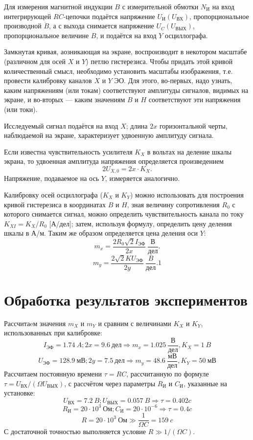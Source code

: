 \documentclass[a4paper, fontsize=14pt]{article}
\begin{document}
Для измерения магнитной индукции $B$ с измерительной обмотки $N_\text{И}$ на вход интегрирующей $RC$-цепочки подаётся напряжение $U_\text{И} (U_\text{ВХ})$, пропорциональное производной $\dot B$, а с выхода снимается напряжение $U_C (U_\text{ВЫХ})$, пропорциональное величине $B$, и подаётся на вход $Y$ осциллографа.

Замкнутая кривая, аозникающая на экране, воспроизводит в некотором масштабе (различном для осей $X$ и $Y$) петлю гистерезиса. Чтобы придать этой кривой количественный смысл, необходимо установить масштабы изображения, т.е. провести калибровку каналов $X$ и $Y$ ЭО. Для этого, во-первых, надо узнать, каким напряжениям (или токам) соответствуют амплитуды сигналов, видимых на экране, и во-вторых --- каким значениям $B$ и $H$ соответствуют эти напряжения (или токи).

Исследуемый сигнал подаётся на вход $X$; длина $2x$ горизонтальной черты, наблюдаемой на экране, характеризует удвоенную амплитуду сигнала.

Если известна чувствительность усилителя $K_X$ в вольтах на деление шкалы экрана, то удвоенная амплитуда напряжения определяется произведением
\[
	2 U_{X, 0} = 2x \cdot K_X.
\]
Напряжение, подаваемое на ось $Y$, измеряется аналогично.

Калибровку осей осциллографа ($K_X$ и $K_Y$) можно использовать для построения кривой гистерезиса в координатах $B$ и $H$, зная величину сопротивления $R_0$ с которого снимается сигнал, можно определить чувствительность канала по току $K_{XI} = K_X / R_0 $ [А/дел]; затем, используя формулу, определить цену деления шкалы в А/м. Таким же образом определяется цена деления оси $Y$:
\[
	m_x = \frac{2R_0 \sqrt{2} I_\text{ЭФ}}{2x}\ \frac{\text{В}}{\text{дел}}.
\]
\[
	m_y = \frac{2 \sqrt{2} K U_\text{ЭФ}}{2y}\ \frac{B}{\text{дел}}.1
\]
\section*{Обработка результатов экспериментов}
Рассчитаeм значения $m_X$ и $m_Y$ и сравним с величинами $K_X$ и $K_Y$, использованных при калибровке:
\[
	I_\text{ЭФ} = 1.74\ A; 2x = 9.6\ \text{дел} \Rightarrow m_x = 1.025\ \frac{\text{В}}{\text{дел}}, K_X = 1\ B
\]
\[
	U_\text{ЭФ} = 128.9\ \text{мВ}; 2y = 7.5\ \text{дел}  \Rightarrow m_y = 48.6\ \frac{\text{мВ}}{\text{дел}}, K_Y = 50\ \text{мВ}
\]
Рассчитаем постоянную времени $\tau = RC$, рассчитанную по формуле $\tau = U_\text{ВХ} / (\Omega U_\text{ВЫХ})$, с рассчётом через параметры $R_\text{И}$ и $C_\text{И}$, указанные на установке:
\[
	U_\text{ВХ} = 7.2\ B; U_\text{ВЫХ} = 0.057\ B \Rightarrow \tau = 0.402 c
\]
\[
	R_\text{И} = 20 \cdot 10^3\ \text{Ом}; C_\text{И} = 20 \cdot 10^{-6} \Rightarrow \tau = 0.4 c
\]
\[
	R = 20 \cdot 10^3 \ \text{Ом} \gg \frac{1}{\Omega C} = 159\ c
\]
С достаточной точностью выполняется условие $R \gg 1 / (\Omega C)$.
\end{document}

